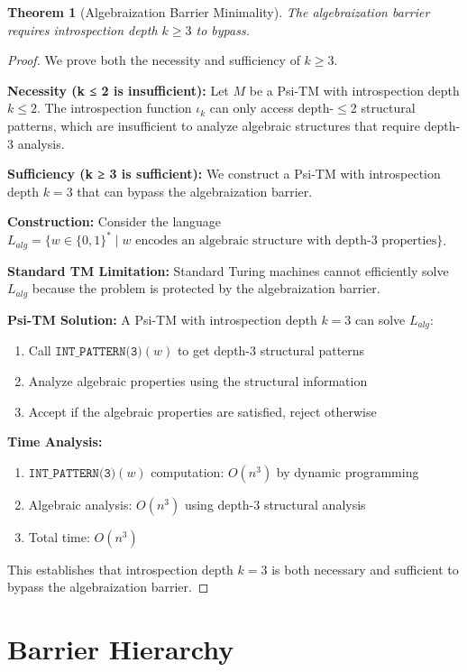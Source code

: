 \documentclass[11pt]{article}
\newtheorem{theorem}{Theorem}
\begin{document}
\begin{theorem}[Algebraization Barrier Minimality]
The algebraization barrier requires introspection depth $k \geq 3$ to bypass.
\end{theorem}

\begin{proof}
We prove both the necessity and sufficiency of $k \geq 3$.

\textbf{Necessity (k ≤ 2 is insufficient):}
Let $M$ be a Psi-TM with introspection depth $k \leq 2$. The introspection function $\iota_k$ can only access depth-$\leq$2 structural patterns, which are insufficient to analyze algebraic structures that require depth-3 analysis.

\textbf{Sufficiency (k ≥ 3 is sufficient):}
We construct a Psi-TM with introspection depth $k = 3$ that can bypass the algebraization barrier.

\textbf{Construction:}
Consider the language $L_{alg} = \{w \in \{0,1\}^* \mid w \text{ encodes an algebraic structure with depth-3 properties}\}$.

\textbf{Standard TM Limitation:}
Standard Turing machines cannot efficiently solve $L_{alg}$ because the problem is protected by the algebraization barrier.

\textbf{Psi-TM Solution:}
A Psi-TM with introspection depth $k = 3$ can solve $L_{alg}$:
\begin{enumerate}
\item Call $\texttt{INT\_PATTERN(3)}(w)$ to get depth-3 structural patterns
\item Analyze algebraic properties using the structural information
\item Accept if the algebraic properties are satisfied, reject otherwise
\end{enumerate}

\textbf{Time Analysis:}
\begin{enumerate}
\item $\texttt{INT\_PATTERN(3)}(w)$ computation: $O(n^3)$ by dynamic programming
\item Algebraic analysis: $O(n^3)$ using depth-3 structural analysis
\item Total time: $O(n^3)$
\end{enumerate}

This establishes that introspection depth $k = 3$ is both necessary and sufficient to bypass the algebraization barrier.
\end{proof}

\section{Barrier Hierarchy}
\end{document}

